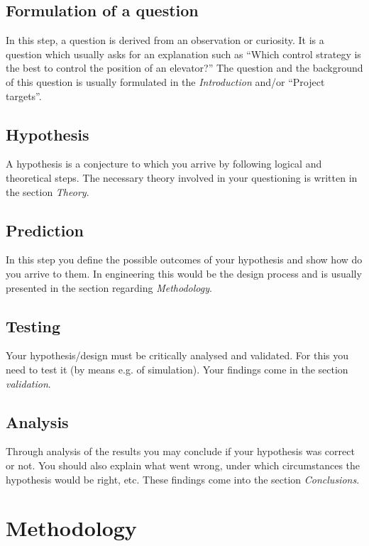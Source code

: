 \documentclass[a4paper, 10pt]{IEEEtran}
\begin{document}
	\subsection{Formulation of a question}
	
	In this step, a question is derived from an observation or curiosity. It is a question which usually asks for an explanation such as ``Which control strategy is the best to control the position of an elevator?'' The question and the background of this question is usually formulated in the \emph{Introduction} and/or ``Project targets''.
	
	\subsection{Hypothesis}
	
	A hypothesis is a conjecture to which you arrive by following logical and theoretical steps. The necessary theory involved in your questioning is written in the section \emph{Theory}.
	
	\subsection{Prediction}
	
	In this step you define the possible outcomes of your hypothesis and show how do you arrive to them. In engineering this would be the design process and is usually presented in the section regarding \emph{Methodology}.
	
	\subsection{Testing}
	
	Your hypothesis/design must be critically analysed and validated. For this you need to test it (by means e.g. of simulation). Your findings come in the section \emph{validation}.
	
	\subsection{Analysis}
	
	Through analysis of the results you may conclude if your hypothesis was correct or not. You should also explain what went wrong, under which circumstances the hypothesis would be right, etc. These findings come into the section \emph{Conclusions}.
	
	\section{Methodology} 
	
\end{document}
